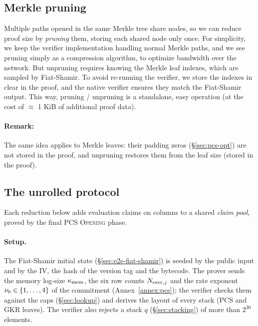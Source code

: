 \subsection{Merkle pruning}\label{sec:e2e-merkle-pruning}

Multiple paths opened in the same Merkle tree share nodes, so we can reduce proof size by \emph{pruning} them, storing each shared node only once. For simplicity, we keep the verifier implementation handling normal Merkle paths, and we see pruning simply as a compression algorithm, to optimize bandwidth over the network. But unpruning requires knowing the Merkle leaf indexes, which are sampled by Fiat-Shamir. To avoid re-running the verifier, we store the indexes in clear in the proof, and the native verifier ensures they match the Fiat-Shamir output. This way, pruning / unpruning is a standalone, easy operation (at the cost of $\approx$ 1 KiB of additional proof data).

\paragraph{Remark:} The same idea applies to Merkle leaves: their padding zeros (\S\ref{sec:pcs-opt}) are not stored in the proof, and unpruning restores them from the leaf size (stored in the proof).

\subsection{The unrolled protocol}\label{sec:e2e-unrolled}

Each reduction below adds evaluation claims on columns to a shared \emph{claim pool}, proved by the final PCS \textsc{Opening} phase.

\paragraph{Setup.}


The Fiat-Shamir initial state (\S\ref{sec:e2e-fiat-shamir}) is seeded by the public input and by the IV, the hash of the version tag and the bytecode. The prover sends the memory log-size $\kappa_{\mathrm{mem}}$, the six row counts $N_{\mathrm{exec},j}$ and the rate exponent $\nu_0\in\{1,\dots,4\}$ of the commitment (Annex~\ref{annex:pcs}); the verifier checks them against the caps (\S\ref{sec:lookup}) and derives the layout of every stack (PCS and GKR leaves). The verifier also rejects a stack $q$ (\S\ref{sec:stacking}) of more than $2^{30}$ elements.


